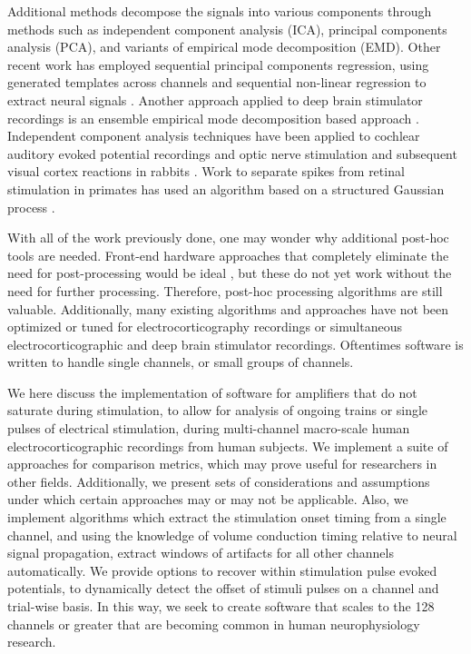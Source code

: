 Additional methods decompose the signals into various components through methods such as independent component analysis (ICA), principal components analysis (PCA), and variants of empirical mode decomposition (EMD). Other recent work has employed sequential principal components regression, using generated templates across channels and sequential non-linear regression to extract neural signals \cite{OShea2017}. Another approach applied to deep brain stimulator recordings is an ensemble empirical mode decomposition based approach \cite{Al-ani2011}. Independent component analysis techniques have been applied to cochlear auditory evoked potential recordings \cite{Gilley2006} and optic nerve stimulation and subsequent visual cortex reactions in rabbits \cite{Lu2012}.  Work to separate spikes from retinal stimulation in primates has used an algorithm based on a structured Gaussian process \cite{Mena2017}. 

With all of the work previously done, one may wonder why additional post-hoc tools are needed. Front-end hardware approaches that completely eliminate the need for post-processing would be ideal \cite{Zhou2018}, but these do not yet work without the need for further processing. Therefore, post-hoc processing algorithms are still valuable. Additionally, many existing algorithms and approaches have not been optimized or tuned for electrocorticography recordings or simultaneous electrocorticographic and deep brain stimulator recordings. Oftentimes software is written to handle single channels, or small groups of channels. 

We here discuss the implementation of software for amplifiers that do not saturate during stimulation, to allow for analysis of ongoing trains or single pulses of electrical stimulation, during multi-channel macro-scale human electrocorticographic recordings from human subjects. We implement a suite of approaches for comparison metrics, which may prove useful for researchers in other fields. Additionally, we present sets of considerations and assumptions under which certain approaches may or may not be applicable. Also, we implement algorithms which extract the stimulation onset timing from a single channel, and using the knowledge of volume conduction timing relative to neural signal propagation, extract windows of artifacts for all other channels automatically. We provide options to recover within stimulation pulse evoked potentials, to dynamically detect the offset of stimuli pulses on a channel and trial-wise basis. In this way, we seek to create software that scales to the 128 channels or greater that are becoming common in human neurophysiology research. 

